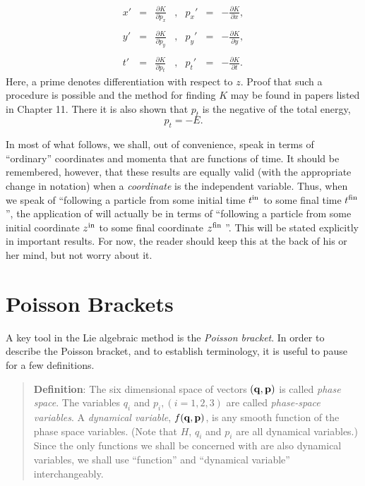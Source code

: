      \begin{equation}
     \begin{array}{lllllll}
      x' &= &{\displaystyle \frac{\partial K}{\partial p_x}} & , &
p_x'& = &-{\displaystyle \frac{\partial K}{\partial x}}, \\
\\
      y' &= &{\displaystyle \frac{\partial K}{\partial p_y}} & , &
p_y'& = &-{\displaystyle \frac{\partial K}{\partial y}}, \\
\\
      t' &= &{\displaystyle \frac{\partial K}{\partial p_t}} & , &
p_t'& = &-{\displaystyle\frac{\partial K}{\partial t}}.
     \end{array}
     \end{equation}
Here, a prime denotes differentiation with respect to $z$.  Proof that such a
procedure is possible and the method for finding $K$ may be found in papers
listed in Chapter 11.  There it is also shown
that $p_t$ is the negative of the total energy,
 \begin{equation}
                           p_t  = - E.
 \end{equation}

      In most of what follows, we shall, out of convenience, speak in terms
of ``ordinary'' coordinates and momenta that are functions of time.  It
should be remembered, however, that these results are equally valid (with
the appropriate change in notation) when a {\em coordinate} is the independent
variable. Thus, when we speak of ``following a particle from some initial
time $t^{\mbox{\scriptsize in}}$ to some final time $t^{\mbox{\scriptsize fin}}$ '', the application of \Mary will actually
be in terms of ``following a particle from some initial coordinate
$z^{\mbox{\scriptsize in}}$  to some final coordinate $z^{\mbox{\scriptsize fin}}$ ''.  This will be stated explicitly in important
results.  For now, the reader should keep this at the back of his or her
mind, but not worry about it.

\section{Poisson Brackets}
\label{poisson}
    A key tool in the Lie algebraic method is the {\em Poisson bracket}.  In
order to describe the Poisson bracket, and to establish terminology, it is
useful to pause for a few definitions.

\begin{quote}
         {\bf Definition}:  The six dimensional space of vectors
$({\bf q},{\bf p})$ is called
         {\em phase space}.  The variables $q_i$  and $p_i, (i = 1,2,3)$ are  called
         {\em phase-space variables}.  A {\em dynamical variable},
$f({\bf q},{\bf p})$, is
         any smooth function of the phase space variables.  (Note that  $H$,
         $q_i$ and $p_i$  are all dynamical variables.)  Since the only  functions
         we shall be concerned with are also dynamical variables, we shall
         use ``function'' and ``dynamical variable''  interchangeably.
\end{quote}

